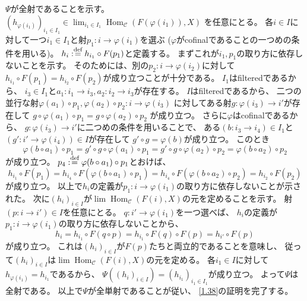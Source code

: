 \documentclass[uplatex,dvipdfmx]{jsarticle}
\makeatletter
\theoremstyle{definition}
\renewenvironment{proof}[1][\proofname]{
  \pushQED{\qed}%
  \normalfont \topsep6\p@\@plus6\p@\relax
  \trivlist
  \item[\hskip\labelsep
    #1\@addpunct{\textbf{.}}]\ignorespaces
}{%
  \popQED\endtrivlist\@endpefalse
}
\providecommand{\proofname}{証明}
\DeclareMathOperator{\Hom}{\mathrm{Hom}}
\newcommand\mcC{\mathcal{C}}
\def\dfn{:\overset{\mbox{{\scriptsize def}}}{=}}
\makeatother
\begin{document}
\begin{proof}
  \(\Psi\)が全射であることを示す。
  \((h_{\varphi(i_1)})_{i_1\in I_1}\in \lim_{i_1\in I_1}\Hom_{\mcC}(F(\varphi(i_1)),X)\)
  を任意にとる。
  各\(i\in I\)に対して一つ\(i_1\in I_1\)と射\(p_1:i\to \varphi(i_1)\)を選ぶ
  (\(\varphi\)がcofinalであることの一つめの条件を用いる)。
  \(h_i \dfn h_{i_1}\circ F(p_1)\)と定義する。
  まずこれが\(i_1,p_1\)の取り方に依存しないことを示す。
  そのためには、別の\(p_2:i\to \varphi(i_2)\)に対して
  \(h_{i_1}\circ F(p_1) = h_{i_2}\circ F(p_2)\)が成り立つことが十分である。
  \(I_1\)はfilteredであるから、
  \(i_3\in I_1\)と\(a_1:i_1\to i_3,a_2:i_2\to i_3\)が存在する。
  \(I\)はfilteredであるから、
  二つの並行な射\(\varphi(a_1)\circ p_1, \varphi(a_2)\circ p_2: i \to \varphi(i_3)\)
  に対してある射\(g:\varphi(i_3)\to i'\)が存在して
  \(g\circ \varphi(a_1)\circ p_1 = g\circ \varphi(a_2)\circ p_2\)
  が成り立つ。
  さらに\(\varphi\)はcofinalであるから、
  \(g:\varphi(i_3)\to i'\)に二つめの条件を用いることで、
  ある\((b:i_3\to i_4)\in I_1\)と\((g':i'\to \varphi(i_4))\in I\)が存在して
  \(g' \circ g = \varphi(b)\)が成り立つ。
  このとき
  \[
  \varphi(b\circ a_1) \circ p_1
  = g'\circ g \circ \varphi(a_1) \circ p_1
  = g'\circ g \circ \varphi(a_2) \circ p_2
  = \varphi(b\circ a_2) \circ p_2
  \]
  が成り立つ。
  \(p_4 \dfn \varphi(b\circ a_1) \circ p_1\)とおけば、
  \[
  h_{i_1}\circ F(p_1)
  = h_{i_4} \circ F(\varphi(b\circ a_1)\circ p_1)
  = h_{i_4} \circ F(\varphi(b\circ a_2)\circ p_2)
  = h_{i_2}\circ F(p_2)
  \]
  が成り立つ。
  以上で\(h_i\)の定義が\(p_1:i\to \varphi(i_1)\)の取り方に依存しないことが示された。
  次に\((h_i)_{i\in I}\)が\(\lim\Hom_{\mcC}(F(i),X)\)の元を定めることを示す。
  射\((p:i\to i')\in I\)を任意にとる。
  \(q:i'\to \varphi(i_1)\)を一つ選べば、
  \(h_i\)の定義が\(p_1:i\to \varphi(i_1)\)の取り方に依存しないことから、
  \[
  h_i = h_{i_1}\circ F(q\circ p)
  = h_{i_1}\circ F(q) \circ F(p)
  = h_{i'} \circ F(p)
  \]
  が成り立つ。
  これは\((h_i)_{i\in I}\)が\(F(p)\)たちと両立的であることを意味し、
  従って\((h_i)_{i\in I}\)は\(\lim\Hom_{\mcC}(F(i),X)\)の元を定める。
  各\(i_1\in I\)に対して\(h_{\varphi(i_1)} = h_{i_1}\)であるから、
  \(\Psi((h_i)_{i\in I}) = (h_{i_1})_{i_1\in I_1}\)が成り立つ。
  よって\(\Psi\)は全射である。
  以上で\(\Psi\)が全単射であることが従い、
  \autoref{1.38}の証明を完了する。
\end{proof}
\end{document}

